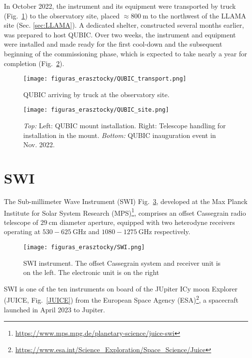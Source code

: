 \documentclass[baaa]{baaa}
\begin{document}
In October 2022, the instrument and its equipment were transported by truck (Fig.~\ref{QUBIC_transport}) to the observatory site, placed $\approx 800~\mathrm{m}$ to the northwest of the LLAMA site (Sec. \ref{sec:LLAMA}). A dedicated shelter, constructed several months earlier, was prepared to host QUBIC. Over two weeks, the instrument and equipment were installed and made ready for the first cool-down and the subsequent beginning of the commissioning phase, which is expected to take nearly a year for completion (Fig.~\ref{QUBIC_site}).

\begin{figure}[!t]
\centering
\texttt{[image: figuras\_erasztocky/QUBIC\_transport.png]}
\caption{QUBIC arriving by truck at the observatory site.}
\label{QUBIC_transport}
\end{figure}

\begin{figure}[!t]
\centering
\texttt{[image: figuras\_erasztocky/QUBIC\_site.png]}
\caption{\emph{Top:} Left: QUBIC mount installation. Right: Telescope handling for installation in the mount. \emph{Bottom:} QUBIC inauguration event in Nov. 2022.}
\label{QUBIC_site}
\end{figure}

\section{SWI}\label{sec:SWI}

The Sub-millimeter Wave Instrument (SWI) Fig.~\ref{SWI}, developed at the Max Planck Institute for Solar System Research (MPS)\footnote{\url{https://www.mps.mpg.de/planetary-science/juice-swi}}, comprises an offset Cassegrain radio telescope of $29~\mathrm{cm}$ diameter aperture, equipped with two heterodyne receivers operating at $530-625~\mathrm{GHz}$ and $1080-1275~\mathrm{GHz}$ respectively\citep{kotiranta2018optical}.  

\begin{figure}[!t]
\centering
\texttt{[image: figuras\_erasztocky/SWI.png]}
\caption{SWI instrument. The offset Cassegrain system and receiver unit is on the left. The electronic unit is on the right}
\label{SWI}
\end{figure}

SWI is one of the ten instruments on board of the JUpiter ICy moon Explorer (JUICE, Fig.~\ref{JUICE}) from the European Space Agency (ESA)\footnote{\url{https://www.esa.int/Science_Exploration/Space_Science/Juice}}, a spacecraft launched in April 2023 to Jupiter. 
\end{document}
